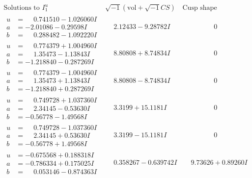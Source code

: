 \documentclass[1p]{elsarticle_modified}
\theoremstyle{definition}
\newcommand{\I}{\sqrt{-1}}
\begin{document}
$$\begin{array}{c|c|c}
\text{Solutions to }I^u_{1}& \I (\text{vol} + \sqrt{-1}CS) & \text{Cusp shape}\\
 \hline 
\begin{aligned}
u &= \phantom{-}0.741510 - 1.026060 I \\
a &= -2.01086 - 0.29598 I \\
b &= \phantom{-}0.288482 - 1.092220 I\end{aligned}
 & \phantom{-}2.12433 - 9.28782 I & \phantom{-0.000000 } 0 \\ \hline\begin{aligned}
u &= \phantom{-}0.774379 + 1.004960 I \\
a &= \phantom{-}1.35473 - 1.13843 I \\
b &= -1.218840 - 0.287269 I\end{aligned}
 & \phantom{-}8.80808 + 8.74834 I & \phantom{-0.000000 } 0 \\ \hline\begin{aligned}
u &= \phantom{-}0.774379 - 1.004960 I \\
a &= \phantom{-}1.35473 + 1.13843 I \\
b &= -1.218840 + 0.287269 I\end{aligned}
 & \phantom{-}8.80808 - 8.74834 I & \phantom{-0.000000 } 0 \\ \hline\begin{aligned}
u &= \phantom{-}0.749728 + 1.037360 I \\
a &= \phantom{-}2.34145 - 0.53630 I \\
b &= -0.56778 - 1.49568 I\end{aligned}
 & \phantom{-}3.3199 + 15.1181 I & \phantom{-0.000000 } 0 \\ \hline\begin{aligned}
u &= \phantom{-}0.749728 - 1.037360 I \\
a &= \phantom{-}2.34145 + 0.53630 I \\
b &= -0.56778 + 1.49568 I\end{aligned}
 & \phantom{-}3.3199 - 15.1181 I & \phantom{-0.000000 } 0 \\ \hline\begin{aligned}
u &= -0.675568 + 0.188318 I \\
a &= -0.786334 + 0.175025 I \\
b &= \phantom{-}0.053146 - 0.874363 I\end{aligned}
 & \phantom{-}0.358267 - 0.639742 I & \phantom{-}9.73626 + 0.89260 I \\ \hline\begin{aligned}

\end{aligned}
\end{array}$$
\end{document}

